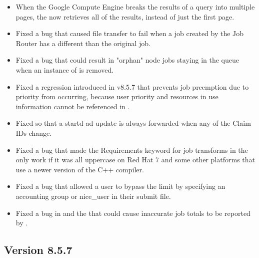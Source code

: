 \begin{itemize}

\item When the Google Compute Engine breaks the results of a query into
multiple pages, the  now retrieves all of the results,
instead of just the first page.

\item Fixed a bug that caused file transfer to fail when a job created
by the Job Router has a different  than the original job.

\item Fixed a bug that could result in "orphan" node jobs staying
in the queue when an instance of  is removed.

\item Fixed a regression introduced in v8.5.7 that prevents job preemption
due to priority from occurring, because 
user priority and resources in use information cannot be referenced in 
.

\item Fixed  so that a startd ad
update is always forwarded when any of the Claim IDs change.

\item Fixed a bug that made the Requirements keyword for job transforms
in the  only work if it was all uppercase on Red Hat 7 and
some other platforms that use a newer version of the C++ compiler.

\item Fixed a bug that allowed a user to bypass the 
limit by specifying an accounting group or nice\_user in their submit file.

\item Fixed a bug in  and the  that could cause inaccurate
job totals to be reported by  .


\end{itemize}

\subsection*{\label{sec:New-8-5-7}Version 8.5.7}

